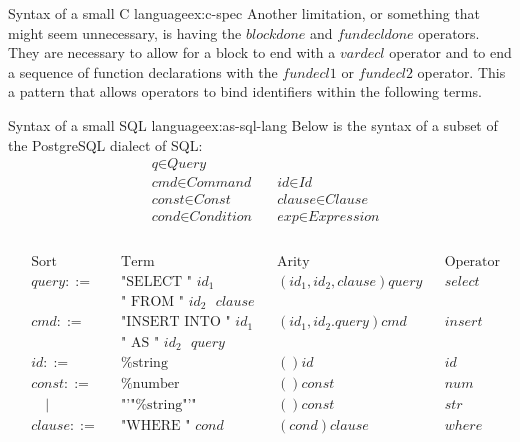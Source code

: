 \documentclass{article}
\begin{document}
\begin{example}{Syntax of a small C language}{ex:c-spec}
Another limitation, or something that might seem unnecessary, is having the $blockdone$ and $fundecldone$ operators. They are necessary to allow for a block to end with a $vardecl$ operator and to end a sequence of function declarations with the $fundecl1$ or $fundecl2$ operator. This a pattern that allows operators to bind identifiers within the following terms.

\end{example}
\begin{example}{Syntax of a small SQL language}{ex:as-sql-lang}
Below is the syntax of a subset of the PostgreSQL\cite{postgresql-about} dialect of SQL:
\[
\begin{aligned}
&\textit{q} \in \textit{Query}          \\
&\textit{cmd} \in \textit{Command}      \quad &\textit{id} \in \textit{Id} \\
&\textit{const} \in \textit{Const}      \quad &\textit{clause} \in \textit{Clause} \\
&\textit{cond} \in \textit{Condition}   \quad &\textit{exp} \in \textit{Expression} \\
\end{aligned}
\]
\\
\[
\begin{aligned}
&\text{Sort}&   &\text{Term}&                                       &\text{Arity}&              &\text{Operator}            \\
&query ::=&     &\text{"SELECT " $id_1$}&                           &(id_1,id_2,clause)query&   &select                       \\
&           &   &\text{" FROM " $id_2$ $clause$}\\
& cmd ::=&      &\text{"INSERT INTO " $id_1$}&                      &(id_1,id_2.query)cmd&      &insert                   \\
&           &   &\text{" AS " $id_2$ $query$}&\\
&id ::=&        &\text{\%string}&                                   &()id&                      &id                   \\
&const ::=&     &\text{\%number}&                                   &()const&                   &num                   \\
& \quad | &     &\text{"'"\%string"'"}&                             &()const&                   &str                \\
&clause ::=&    &\text{"WHERE " $cond$}&                            &(cond)clause&              &where                   \\

\end{aligned}\]
\end{example}
\end{document}
